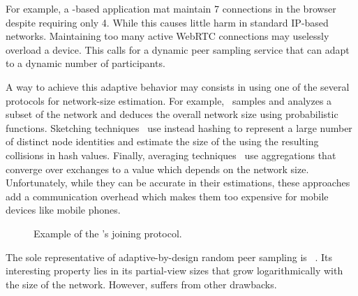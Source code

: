 For example, a \CYCLON-based application mat maintain 7 connections in
the browser despite requiring only 4. While this causes little harm in
standard IP-based networks. Maintaining too many active WebRTC
connections may uselessly overload a device. This calls for a dynamic
peer sampling service that can adapt to a dynamic number of
participants.

A way to achieve this adaptive behavior may consists in using one of
the several protocols for network-size estimation. For
example,~\cite{ganesh2007peer} samples and analyzes a subset of the
network and deduces the overall network size using probabilistic
functions.  Sketching techniques~\cite{baquero2012extrema} use instead
hashing to represent a large number of distinct node identities and
estimate the size of the using the resulting collisions in hash
values. Finally, averaging techniques~\cite{jelasity2004epidemic} use
aggregations that converge over exchanges to a value which depends on
the network size. Unfortunately, while they can be accurate in their
estimations, these approaches add a communication overhead which makes
them too expensive for mobile devices like mobile phones.



\begin{figure*}
  \centering
  \hspace{8pt}
  \hspace{8pt}
  \caption{\label{fig:joiningexample}Example of the \SPRAY's joining
    protocol.}
\end{figure*}

The sole representative of adaptive-by-design random peer sampling is
\SCAMP~\cite{ganesh2003peer}. Its interesting property lies in its
partial-view sizes that grow logarithmically with the size of the
network. However, \SCAMP suffers from other drawbacks.

